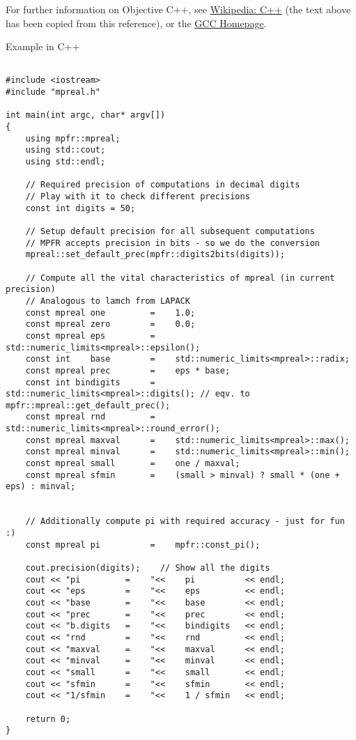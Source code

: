 \vpara
For further information on Objective C++, see \href{http://en.wikipedia.org/wiki/C\%2B\%2B}{Wikipedia: C++} (the text above has been copied from this reference), or the  \href{http://gcc.gnu.org/}{GCC Homepage}.


\vpara
Example in C++


\begin{lstlisting}

#include <iostream>
#include "mpreal.h"

int main(int argc, char* argv[])
{
    using mpfr::mpreal;    
    using std::cout;
    using std::endl;
    
    // Required precision of computations in decimal digits
    // Play with it to check different precisions
    const int digits = 50; 

    // Setup default precision for all subsequent computations
    // MPFR accepts precision in bits - so we do the conversion 
    mpreal::set_default_prec(mpfr::digits2bits(digits));

    // Compute all the vital characteristics of mpreal (in current precision)
    // Analogous to lamch from LAPACK
    const mpreal one         =    1.0;
    const mpreal zero        =    0.0;
    const mpreal eps         =    std::numeric_limits<mpreal>::epsilon();
    const int    base        =    std::numeric_limits<mpreal>::radix;
    const mpreal prec        =    eps * base;
    const int bindigits      =    std::numeric_limits<mpreal>::digits(); // eqv. to mpfr::mpreal::get_default_prec();
    const mpreal rnd         =    std::numeric_limits<mpreal>::round_error();
    const mpreal maxval      =    std::numeric_limits<mpreal>::max();
    const mpreal minval      =    std::numeric_limits<mpreal>::min();
    const mpreal small       =    one / maxval;
    const mpreal sfmin       =    (small > minval) ? small * (one + eps) : minval;

    
    // Additionally compute pi with required accuracy - just for fun :)
    const mpreal pi          =    mpfr::const_pi();
        
    cout.precision(digits);    // Show all the digits
    cout << "pi         =    "<<    pi          << endl;    
    cout << "eps        =    "<<    eps         << endl;
    cout << "base       =    "<<    base        << endl;
    cout << "prec       =    "<<    prec        << endl;
    cout << "b.digits   =    "<<    bindigits   << endl;
    cout << "rnd        =    "<<    rnd         << endl;
    cout << "maxval     =    "<<    maxval      << endl;    
    cout << "minval     =    "<<    minval      << endl;    
    cout << "small      =    "<<    small       << endl;    
    cout << "sfmin      =    "<<    sfmin       << endl;    
    cout << "1/sfmin    =    "<<    1 / sfmin   << endl;    
 
    return 0;
}

\end{lstlisting}






